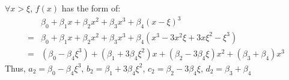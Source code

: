 \documentclass[10pt]{article}
\begin{document}
$\forall x > \xi$, $f(x)$ has the form of:
\begin{align*}
&\beta_0 + \beta_1 x + \beta_2 x^2 + \beta_3 x^3 + \beta_4 (x - \xi)^3
\\
= &\beta_0 + \beta_1 x + \beta_2 x^2 + \beta_3 x^3 + \beta_4 (x^3 - 3 x^2 \xi + 3 x \xi^2 - \xi^3)
\\
= &(\beta_0 - \beta_4 \xi^3) + (\beta_1 + 3 \beta_4 \xi^2) x + (\beta_2 - 3 \beta_4 \xi) x^2 + (\beta_3 + \beta_4) x^3
\end{align*}
\qquad Thus, $a_2 = \beta_0 - \beta_4 \xi^3$, $b_2 = \beta_1 + 3 \beta_4 \xi^2$, $c_2 = \beta_2 - 3 \beta_4 \xi$, $d_2 = \beta_3 + \beta_4$
\end{document}
